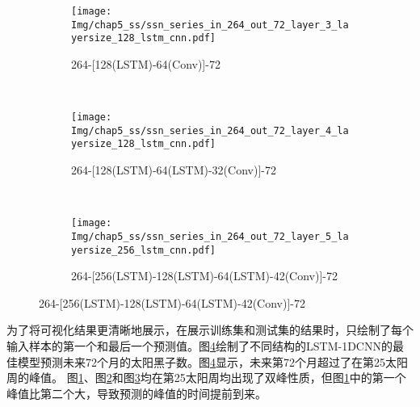 \begin{figure}[!htbp]
  \centering
  \begin{subfigure}[b]{1.0\textwidth}
    \caption{264-[128(LSTM)-64(Conv)]-72} 
    \vspace{-0.35cm}
    \texttt{[image: Img/chap5\_ss/ssn\_series\_in\_264\_out\_72\_layer\_3\_layersize\_128\_lstm\_cnn.pdf]}
    \label{fig:ssn_series_in_264_out_72_layer_3_layersize_128_lstm_cnn}
  \end{subfigure}    \\
  \vspace{-1cm}
  \begin{subfigure}[b]{1.0\textwidth}
    \caption{264-[128(LSTM)-64(LSTM)-32(Conv)]-72}
    \vspace{-0.35cm}
    \texttt{[image: Img/chap5\_ss/ssn\_series\_in\_264\_out\_72\_layer\_4\_layersize\_128\_lstm\_cnn.pdf]}
    \label{fig:ssn_series_in_264_out_72_layer_4_layersize_128_lstm_cnn}
  \end{subfigure} \\
  \vspace{-1cm}
  \begin{subfigure}[b]{1.0\textwidth}
    \caption{264-[256(LSTM)-128(LSTM)-64(LSTM)-42(Conv)]-72}
    \vspace{-0.35cm}
    \texttt{[image: Img/chap5\_ss/ssn\_series\_in\_264\_out\_72\_layer\_5\_layersize\_256\_lstm\_cnn.pdf]}
    \label{fig:ssn_series_in_264_out_72_layer_5_layersize_256_lstm_cnn}
    \end{subfigure}
  \vspace{-2cm}
  \label{fig:ssn_series_in_264_out_72_lstm_cnn}
\end{figure}

为了将可视化结果更清晰地展示，在展示训练集和测试集的结果时，只绘制了每个输入样本的第一个和最后一个预测值。图\ref{fig:ssn_series_in_264_out_72_lstm_cnn}绘制了不同结构的LSTM-1DCNN的最佳模型预测未来72个月的太阳黑子数。图\ref{fig:ssn_series_in_264_out_72_lstm_cnn}显示，未来第72个月超过了在第25太阳周的峰值。
图\ref{fig:ssn_series_in_264_out_72_layer_3_layersize_128_lstm_cnn}、图\ref{fig:ssn_series_in_264_out_72_layer_4_layersize_128_lstm_cnn}和图\ref{fig:ssn_series_in_264_out_72_layer_5_layersize_256_lstm_cnn}均在第25太阳周均出现了双峰性质，但图\ref{fig:ssn_series_in_264_out_72_layer_3_layersize_128_lstm_cnn}中的第一个峰值比第二个大，导致预测的峰值的时间提前到来。

